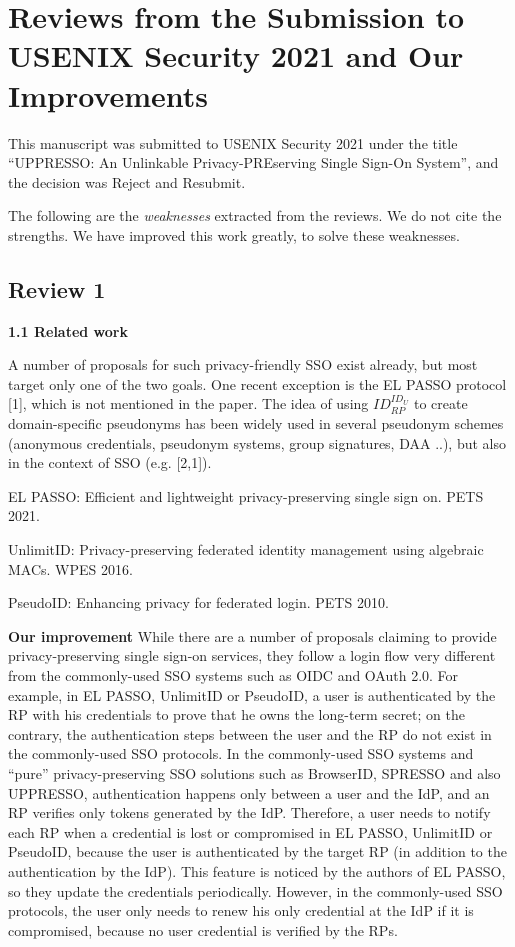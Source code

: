 \documentclass[letterpaper,onecolumn,10pt]{article}
\begin{document}
\section*{Reviews from the Submission to USENIX Security 2021 and Our Improvements}

This manuscript was submitted to USENIX Security 2021 under the title ``UPPRESSO: An Unlinkable Privacy-PREserving Single Sign-On System'',
     and the decision was Reject and Resubmit.

The following are the \emph{weaknesses} extracted from the reviews. We do not cite the strengths.
We have improved this work greatly, to solve these weaknesses.

\subsection*{Review 1}
\noindent\textbf{1.1 Related work}

A number of proposals for such privacy-friendly SSO exist already, but most target only one of the two goals.
One recent exception is the EL PASSO protocol [1], which is not mentioned in the paper.
The idea of using $ID_{RP}^{ID_U}$ to create domain-specific pseudonyms has been widely used in several pseudonym schemes (anonymous credentials, pseudonym systems, group signatures, DAA ..),
     but also in the context of SSO (e.g. [2,1]).

\noindent[1] EL PASSO: Efficient and lightweight privacy-preserving single sign on. PETS 2021.

\noindent[2] UnlimitID: Privacy-preserving federated identity management using algebraic MACs. WPES 2016.

\noindent[3] PseudoID: Enhancing privacy for federated login. PETS 2010.


\vspace{1mm}\noindent\textbf{Our improvement}
While there are a number of proposals claiming to provide privacy-preserving single sign-on services,
    they follow a login flow very different from the commonly-used SSO systems such as OIDC and OAuth 2.0.
For example, in EL PASSO, UnlimitID or PseudoID,
    a user is authenticated by the RP with his credentials
            to prove that he owns the long-term secret;
            on the contrary,
    the authentication steps between the user and the RP do not exist in the commonly-used SSO protocols.
In the commonly-used SSO systems and ``pure'' privacy-preserving SSO solutions
    such as BrowserID, SPRESSO and also UPPRESSO,
    authentication happens only between a user and the IdP,
    and an RP verifies only tokens generated by the IdP.
Therefore,
        a user needs to notify each RP when a credential is lost or compromised in EL PASSO, UnlimitID or PseudoID,
    because the user is authenticated by the target RP (in addition to the authentication by the IdP).
This feature is noticed by the authors of EL PASSO,
    so they update the credentials periodically.
However, in the commonly-used SSO protocols, the user only needs to renew his only credential at the IdP if it is compromised,
    because no user credential is verified by the RPs.
\end{document}
